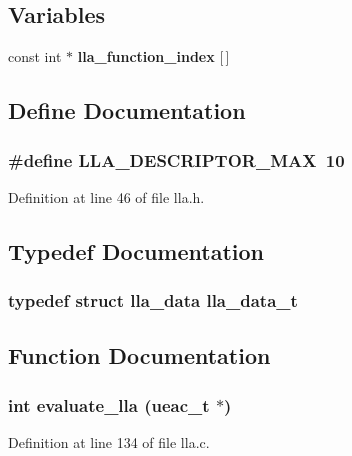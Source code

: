 \subsection*{Variables}
\begin{CompactItemize}
\item 
const int $\ast$ {\bf lla\_\-function\_\-index} [$\,$]
\end{CompactItemize}


\subsection{Define Documentation}
\subsubsection{\setlength{\rightskip}{0pt plus 5cm}\#define LLA\_\-DESCRIPTOR\_\-MAX~10}\label{lla_8h_a0}




Definition at line 46 of file lla.h.

\subsection{Typedef Documentation}
\subsubsection{\setlength{\rightskip}{0pt plus 5cm}typedef struct {\bf lla\_\-data}  {\bf lla\_\-data\_\-t}}\label{lla_8h_a1}




\subsection{Function Documentation}
\subsubsection{\setlength{\rightskip}{0pt plus 5cm}int evaluate\_\-lla ({\bf ueac\_\-t} $\ast$)}\label{lla_8h_a7}




Definition at line 134 of file lla.c.

